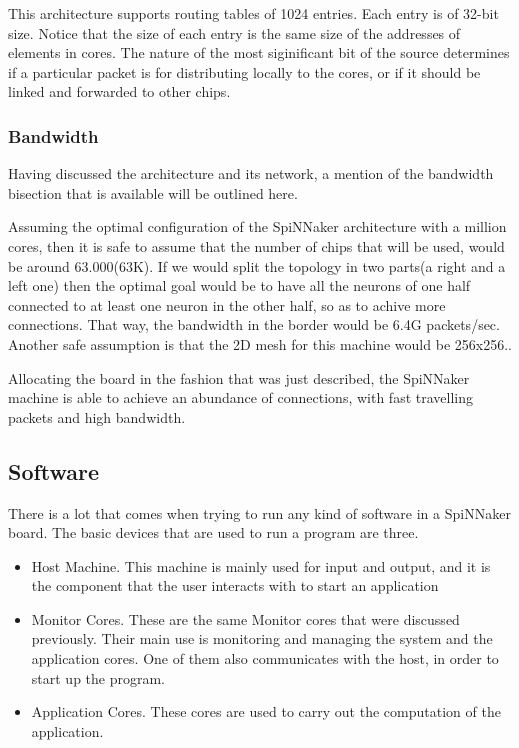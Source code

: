 \documentclass[12pt,a4paper]{article}
\begin{document}
This architecture supports routing tables of 1024 entries. Each entry is of 32-bit size. Notice that the size of each entry is the same size of the addresses of elements in cores. The nature of the most siginificant bit of the source determines if a particular packet is for distributing locally to the cores, or if it should be linked and forwarded to other chips\cite{docfile}.

\subsubsection{Bandwidth}
Having discussed the architecture and its network, a mention of the bandwidth bisection that is available will be outlined here. 

Assuming the optimal configuration of the SpiNNaker architecture with a million cores, then it is safe to assume that the number of chips that will be used, would be around 63.000(63K). If we would split the topology in two parts(a right and a left one) then the optimal goal would be to have all the neurons of one half connected to at least one neuron in the other half, so as to achive more connections. That way, the bandwidth in the border would be 6.4G packets/sec. Another safe assumption is that the 2D mesh for this machine would be 256x256.\cite{docfile}\cite{navaridas2009understanding}.

Allocating the board in the fashion that was just described, the SpiNNaker machine is able to achieve an abundance of connections, with fast travelling packets and high bandwidth.
\subsection{Software}
There is a lot that comes when trying to run any kind of software in a SpiNNaker board. The basic devices that are used to run a program are three.
\begin{itemize}
\item Host Machine. This machine is mainly used for input and output, and it is the component that the user interacts with to start an application
\item Monitor Cores. These are the same Monitor cores that were discussed previously. Their main use is monitoring and managing the system and the application cores. One of them also communicates with the host, in order to start up the program.
\item Application Cores. These cores are used to carry out the computation of the application.\cite{furber2012overview}
\end{itemize}
\end{document}
